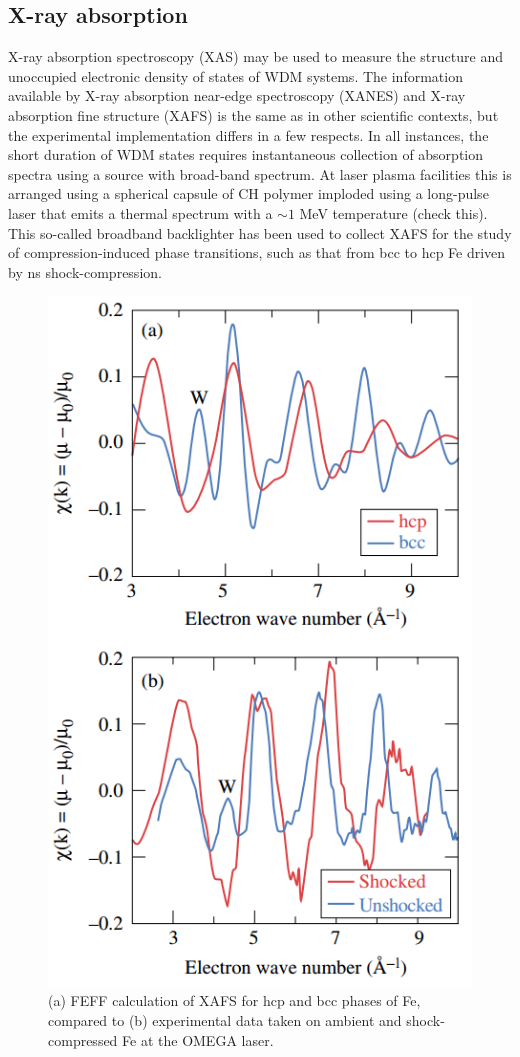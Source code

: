 \documentclass [11pt, proquest, article] {uwthesis}[2016/11/22]
\begin{document}
\subsection{X-ray absorption}
X-ray absorption spectroscopy (XAS) may be used to measure the structure and unoccupied electronic density of states of WDM systems. The information available by X-ray absorption near-edge spectroscopy (XANES) and X-ray absorption fine structure (XAFS) is the same as in other scientific contexts, but the experimental implementation differs in a few respects. In all instances, the short duration of WDM states requires instantaneous collection of absorption spectra using a source with broad-band spectrum. At laser plasma facilities this is arranged using a spherical capsule of CH polymer imploded using a long-pulse laser that emits a thermal spectrum with a $\sim 1$ MeV temperature (check this).\cite{yaakobi2003extended} This so-called broadband backlighter has been used to collect XAFS for the study of compression-induced phase transitions, such as that from bcc to hcp Fe driven by ns shock-compression.\cite{yaakobi2005exafs}

\begin{figure}[h] 
\caption{(a) FEFF calculation of XAFS for hcp and bcc phases of Fe, compared to (b) experimental data taken on ambient and shock-compressed Fe at the OMEGA laser. \cite{yaakobi2005exafs}}
\label{fig:xafs}
\centering
\includegraphics[scale=0.6]{../Figures/yaakobi_shock_xafs.png}
\end{figure}
\end{document}
